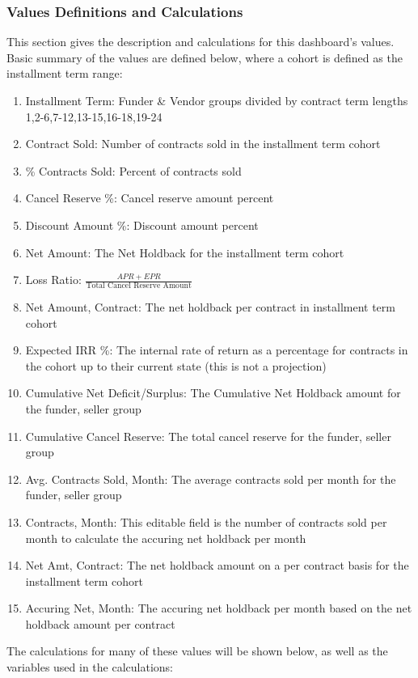 \documentclass[titlepage]{article}
\begin{document}
\subsubsection{Values Definitions and Calculations}
This section gives the description and calculations for this dashboard's values. Basic summary of the values are defined below, where a cohort is defined as the installment term range:
\begin{enumerate}
	\item Installment Term: Funder \& Vendor groups divided by contract term lengths 1,2-6,7-12,13-15,16-18,19-24
	\item Contract Sold: Number of contracts sold in the installment term cohort
	\item \% Contracts Sold:  Percent of contracts sold
	\item Cancel Reserve \%: Cancel reserve amount percent
	\item Discount Amount \%: Discount amount percent
	\item Net Amount: The Net Holdback for the installment term cohort
	\item Loss Ratio: $\frac{APR + EPR}{\text{Total Cancel Reserve Amount}}$
	\item Net Amount, Contract: The net holdback per contract in installment term cohort
	\item Expected IRR \%: The internal rate of return as a percentage for contracts in the cohort up to their current state (this is not a projection)
	\item Cumulative Net Deficit/Surplus: The Cumulative Net Holdback amount for the funder, seller group
	\item Cumulative Cancel Reserve: The total cancel reserve for the funder, seller group
	\item Avg. Contracts Sold, Month: The average contracts sold per month for the funder, seller group
	\item Contracts, Month: This editable field is the number of contracts sold per month to calculate the accuring net holdback per month
	\item Net Amt, Contract: The net holdback amount on a per contract basis for the installment term cohort
	\item Accuring Net, Month: The accuring net holdback per month based on the net holdback amount per contract
\end{enumerate}
The calculations for many of these values will be shown below, as well as the variables used in the calculations:
\end{document}
